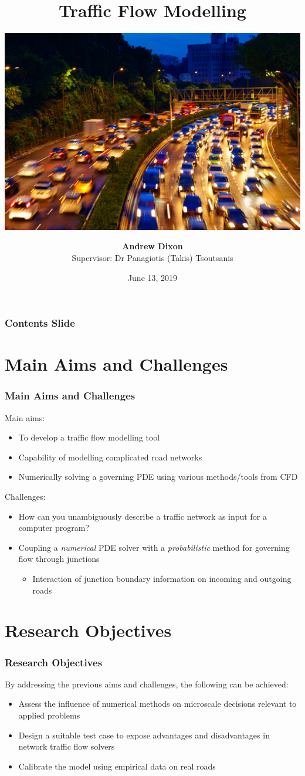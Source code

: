 \documentclass[12pt]{beamer}
\author{\textbf{Andrew Dixon} \\ Supervisor: Dr Panagiotis (Takis) Tsoutsanis \\ }
\title{\LARGE Traffic Flow Modelling}
\subtitle{\vspace{0.4cm}\includegraphics[width=\textwidth, clip, trim={0 100 0 150}]{title.jpg}}
\institute{\textbf{Cranfield University}}
\date{June 13, 2019}
\begin{document}
	\maketitle
	\begin{frame}
		\frametitle{Contents Slide}
		\tableofcontents{}
	\end{frame}
	
\section{Main Aims and Challenges}
	\begin{frame}
		\frametitle{Main Aims and Challenges}
		Main aims:
		\begin{itemize}
		    \item To develop a traffic flow modelling tool 
		    \item Capability of modelling complicated road networks
		    \item Numerically solving a governing PDE using various methods/tools from CFD
		\end{itemize}
		\vspace{0.5cm}
		Challenges:
		\begin{itemize}
		    \item How can you unambiguously describe a traffic network as input for a computer program?
		    \item Coupling a \emph{numerical} PDE solver with a \emph{probabilistic} method for governing flow through junctions
		    \begin{itemize}
		        \item Interaction of junction boundary information on incoming and outgoing roads
		    \end{itemize}
		\end{itemize}
	\end{frame}
	
\section{Research Objectives}
	\begin{frame}
		\frametitle{Research Objectives}
		By addressing the previous aims and challenges, the following can be achieved:
		\begin{itemize}
		    \item Assess the influence of numerical methods on microscale decisions relevant to applied problems
			\item Design a suitable test case to expose advantages and disadvantages in network traffic flow solvers 
			\item Calibrate the model using empirical data on real roads
		\end{itemize}
	\end{frame}
	
\end{document}

